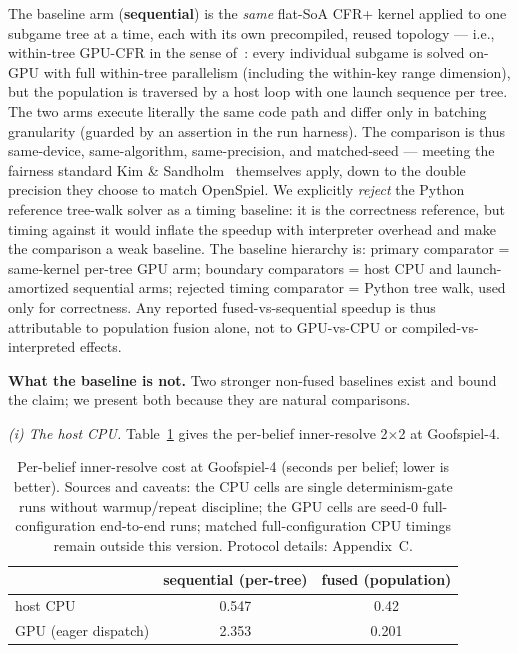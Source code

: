 \documentclass[11pt]{article}
\begin{document}
The baseline arm (\textbf{sequential}) is the \emph{same} flat-SoA CFR+ kernel applied
to one subgame tree at a time, each with its own precompiled, reused topology --- i.e.,
within-tree GPU-CFR in the sense of~\citep{Kim2024}: every individual subgame is solved
on-GPU with full within-tree parallelism (including the within-key range dimension), but
the population is traversed by a host loop with one launch sequence per tree. The two
arms execute literally the same code path and differ only in batching granularity
(guarded by an assertion in the run harness). The comparison is thus same-device,
same-algorithm, same-precision, and matched-seed --- meeting the fairness standard Kim
\& Sandholm~\citep{KimSandholm2026} themselves apply, down to the double precision they
choose to match OpenSpiel. We explicitly \emph{reject} the Python
reference tree-walk solver as a timing baseline: it is the correctness reference, but
timing against it would inflate the speedup with interpreter overhead and make the
comparison a weak baseline. The baseline hierarchy is: primary comparator = same-kernel
per-tree GPU arm; boundary comparators = host CPU and launch-amortized sequential arms;
rejected timing comparator = Python tree walk, used only for correctness. Any reported
fused-vs-sequential speedup is thus attributable to
population fusion alone, not to GPU-vs-CPU or compiled-vs-interpreted effects.

\textbf{What the baseline is not.} Two stronger non-fused baselines exist and bound the
claim; we present both because they are natural comparisons.

\emph{(i) The host CPU.} Table~\ref{tab:2x2} gives the per-belief inner-resolve
2$\times$2 at Goofspiel-4.

\begin{table}[t]
\centering
\caption{Per-belief inner-resolve cost at Goofspiel-4 (seconds per belief; lower is
better). Sources and caveats: the CPU cells are single determinism-gate runs without
warmup/repeat discipline; the GPU cells are seed-0 full-configuration end-to-end runs;
matched full-configuration CPU timings remain outside this version. Protocol details:
Appendix~C.}
\label{tab:2x2}
\begin{tabular}{lcc}
\toprule
 & sequential (per-tree) & fused (population) \\
\midrule
host CPU & 0.547 & 0.42 \\
GPU (eager dispatch) & 2.353 & 0.201 \\
\bottomrule
\end{tabular}
\end{table}
\end{document}
